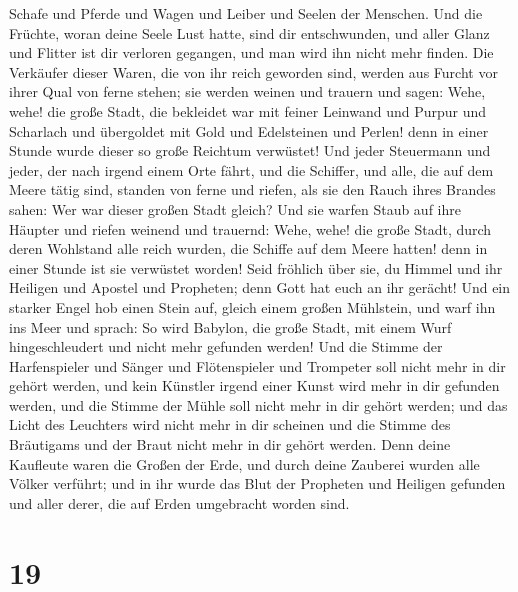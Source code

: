 Schafe und Pferde und Wagen und Leiber und Seelen der Menschen.
 Und die Früchte, woran deine Seele Lust hatte, sind dir
entschwunden, und aller Glanz und Flitter ist dir verloren gegangen, und
man wird ihn nicht mehr finden.  Die Verkäufer dieser
Waren, die von ihr reich geworden sind, werden aus Furcht vor ihrer Qual
von ferne stehen; sie werden weinen und trauern und sagen:
 Wehe, wehe! die große Stadt, die bekleidet war mit
feiner Leinwand und Purpur und Scharlach und übergoldet mit Gold und
Edelsteinen und Perlen! denn in einer Stunde wurde dieser so große
Reichtum verwüstet!  Und jeder Steuermann und jeder, der
nach irgend einem Orte fährt, und die Schiffer, und alle, die auf dem
Meere tätig sind, standen von ferne  und riefen, als sie
den Rauch ihres Brandes sahen: Wer war dieser großen Stadt gleich?
 Und sie warfen Staub auf ihre Häupter und riefen weinend
und trauernd: Wehe, wehe! die große Stadt, durch deren Wohlstand alle
reich wurden, die Schiffe auf dem Meere hatten! denn in einer Stunde ist
sie verwüstet worden!  Seid fröhlich über sie, du Himmel
und ihr Heiligen und Apostel und Propheten; denn Gott hat euch an ihr
gerächt!  Und ein starker Engel hob einen Stein auf,
gleich einem großen Mühlstein, und warf ihn ins Meer und sprach: So wird
Babylon, die große Stadt, mit einem Wurf hingeschleudert und nicht mehr
gefunden werden!  Und die Stimme der Harfenspieler und
Sänger und Flötenspieler und Trompeter soll nicht mehr in dir gehört
werden, und kein Künstler irgend einer Kunst wird mehr in dir gefunden
werden, und die Stimme der Mühle soll nicht mehr in dir gehört werden;
 und das Licht des Leuchters wird nicht mehr in dir
scheinen und die Stimme des Bräutigams und der Braut nicht mehr in dir
gehört werden. Denn deine Kaufleute waren die Großen der Erde, und durch
deine Zauberei wurden alle Völker verführt;  und in ihr
wurde das Blut der Propheten und Heiligen gefunden und aller derer, die
auf Erden umgebracht worden sind.

\hypertarget{section-18}{%
\section{19}\label{section-18}}

